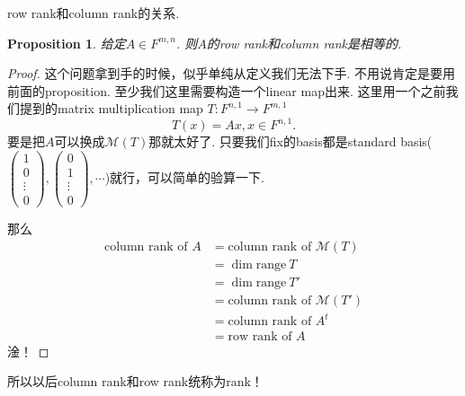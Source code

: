 \documentclass{article}
\newtheorem{proposition}[theorem]{Proposition}
\newcommand*{\xfunc}[4]{{#2}\colon{#3}{#1}{#4}}
\newcommand*{\func}[3]{\xfunc{\to}{#1}{#2}{#3}}
\newcommand\range[1]{\text{range}\ #1}
\begin{document}
{\color{red} row rank和column rank的关系}.
\begin{proposition}
\rm 给定$A \in F^{m,n}$. 则$A$的row rank和column rank是相等的.
\end{proposition}

\begin{proof}
这个问题拿到手的时候，似乎单纯从定义我们无法下手. 不用说肯定是要用前面的proposition. 至少我们这里需要构造一个linear map出来. 这里用一个之前我们提到的matrix multiplication map $\func{T}{F^{n,1}}{F^{m,1}}$
$$
T(x)=Ax, x \in F^{n,1}.
$$
要是把$A$可以换成$\mathcal{M}(T)$那就太好了. 只要我们fix的basis都是standard basis($\begin{pmatrix} 1\\0 \\ \vdots \\ 0 \end{pmatrix},\begin{pmatrix} 0\\1 \\ \vdots \\ 0 \end{pmatrix},\cdots$)就行，可以简单的验算一下.

那么
$$
\begin{aligned}
\text{column rank of } A &= \text{column rank of } \mathcal{M}(T) \\
						 &= \dim \range{T} \\
						 &= \dim \range{T'} \\
						 &= \text{column rank of } \mathcal{M}(T')\\
						 &= \text{column rank of } A^{t} \\
						 &= \text{row rank of } A 	
\end{aligned}
$$
淦！
\end{proof}

{\color{blue} 所以以后column rank和row rank统称为rank}！
\end{document}
